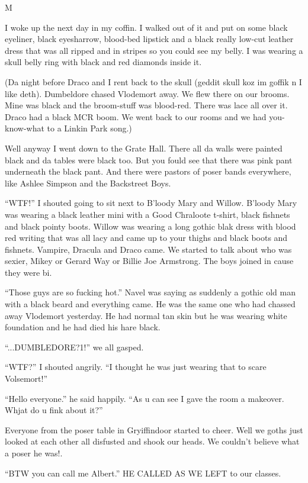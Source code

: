 M\documentclass{article}
\begin{document}
\textbreak
\linenumbers\resetlinenumber

I woke up the next day in my coffin. I walked out of it and put on some black eyeliner, black eyesharrow, blood-bed lipstick and a black really low-cut leather dress that was all ripped and in stripes so you could see my belly. I was wearing a skull belly ring with black and red diamonds inside it.

(Da night before Draco and I rent back to the skull (geddit skull koz im goffik n I like deth). Dumbeldore chased Vlodemort away. We flew there on our brooms. Mine was black and the broom-stuff was blood-red. There was lace all over it. Draco had a black MCR boom. We went back to our rooms and we had you-know-what to a Linkin Park song.)

Well anyway I went down to the Grate Hall. There all da walls were painted black and da tables were black too. But you fould see that there was pink pant underneath the black pant. And there were pastors of poser bands everywhere, like Ashlee Simpson and the Backstreet Boys.

“WTF!” I shouted going to sit next to B’loody Mary and Willow. B’loody Mary was wearing a black leather mini with a Good Chraloote t-shirt, black fishnets and black pointy boots. Willow was wearing a long gothic blak dress with blood red writing that was all lacy and came up to your thighs and black boots and fishnets. Vampire, Dracula and Draco came. We started to talk about who was sexier, Mikey or Gerard Way or Billie Joe Armstrong. The boys joined in cause they were bi.

“Those guys are so fucking hot.” Navel was saying as suddenly a gothic old man with a black beard and everything came. He was the same one who had chassed away Vlodemort yesterday. He had normal tan skin but he was wearing white foundation and he had died his hare black.

“...DUMBLEDORE?1!” we all gasped.

“WTF?” I shouted angrily. “I thought he was just wearing that to scare Volsemort!”

“Hello everyone.” he said happily. “As u can see I gave the room a makeover. Whjat do u fink about it?”

Everyone from the poser table in Gryiffindoor started to cheer. Well we goths just looked at each other all disfusted and shook our heads. We couldn’t believe what a poser he was!.

“BTW you can call me Albert.” HE CALLED AS WE LEFT to our classes.
\end{document}
